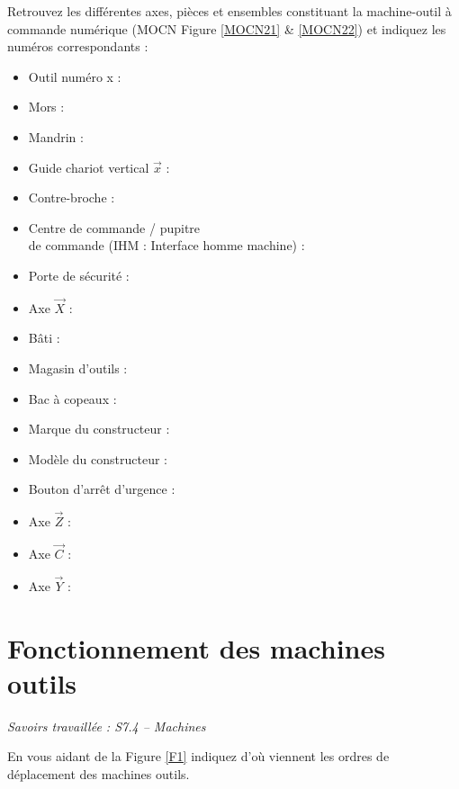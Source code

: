 \documentclass[12pt]{article}
\newcounter{exo}
\newenvironment{exo}{\stepcounter{exo}\vspace{0.5cm}{\bfseries Question \theexo\ :}}{\par\vspace{0.5cm}}
\begin{document}
\begin{exo}\label{exo1} Retrouvez les différentes axes, pièces et ensembles constituant la machine-outil à commande numérique (MOCN Figure \ref{MOCN21} \& \ref{MOCN22}) et indiquez les numéros correspondants :\\ \end{exo}
\begin{minipage}{.55\linewidth}
\begin{itemize}
    \item Outil numéro x :
    \item Mors :
    \item Mandrin :
    \item Guide chariot vertical $\overrightarrow{x}$ :
    \item Contre-broche :
    \item Centre de commande / pupitre\\ de commande (IHM : Interface homme machine) :
    \item Porte de sécurité :
    \item Axe $\overrightarrow{X}$ :
    \item Bâti :
\end{itemize}


\end{minipage}
\begin{minipage}{.44\linewidth}
\begin{itemize}
    \item Magasin d’outils :
    \item Bac à copeaux :
    \item Marque du constructeur :
    \item Modèle du constructeur :
    \item Bouton d'arrêt d’urgence :
    \item Axe $\overrightarrow{Z}$ :
    \item Axe $\overrightarrow{C}$ :
    \item Axe $\overrightarrow{Y}$ :
\end{itemize}
\end{minipage}



\section{Fonctionnement des machines outils}
\textit{Savoirs travaillée : S7.4 – Machines}



\begin{exo}\label{exo1} En vous aidant de la Figure \ref{F1} indiquez d'où viennent les ordres de déplacement des machines outils.\end{exo}
\end{document}
